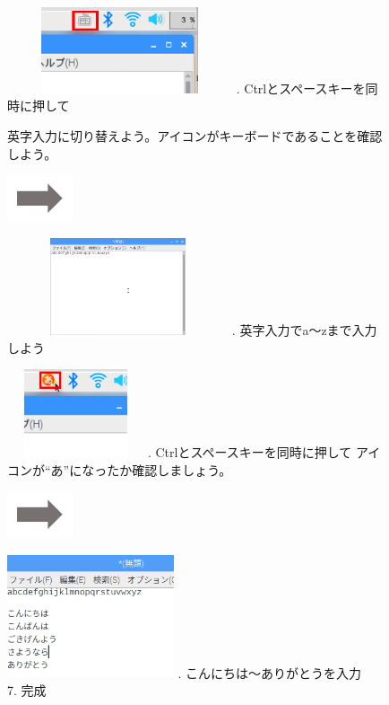 \documentclass[a4paper,12pt]{jarticle}
\begin{document}
\begin{figure}[ht]
  \begin{minipage}{7.238cm}
    \includegraphics[width=6.643cm,height=2.533cm]{textbook-img059.png}
    . Ctrlとスペースキーを同時に押して

    英字入力に切り替えよう。アイコンがキーボードであることを確認しよう。
  \end{minipage}
  \includegraphics[width=1.919cm,height=1.365cm]{textbook-img053.png}
  \begin{minipage}{7.351cm}
    \includegraphics[width=6.514cm,height=2.856cm]{textbook-img061.png}
    . 英字入力でa〜zまで入力しよう
  \end{minipage}

  \begin{minipage}{6.73cm}
    \includegraphics[width=4.029cm,height=2.586cm]{textbook-img062.png}
    . Ctrlとスペースキーを同時に押して
    アイコンが“あ”になったか確認しましょう。
  \end{minipage}
  \includegraphics[width=1.919cm,height=1.365cm]{textbook-img053.png}
  \begin{minipage}{6.589cm}
    \includegraphics[width=4.914cm,height=3.616cm]{textbook-img060.png}
    . こんにちは〜ありがとうを入力\\
    7. 完成
  \end{minipage}




\end{figure}
\end{document}
